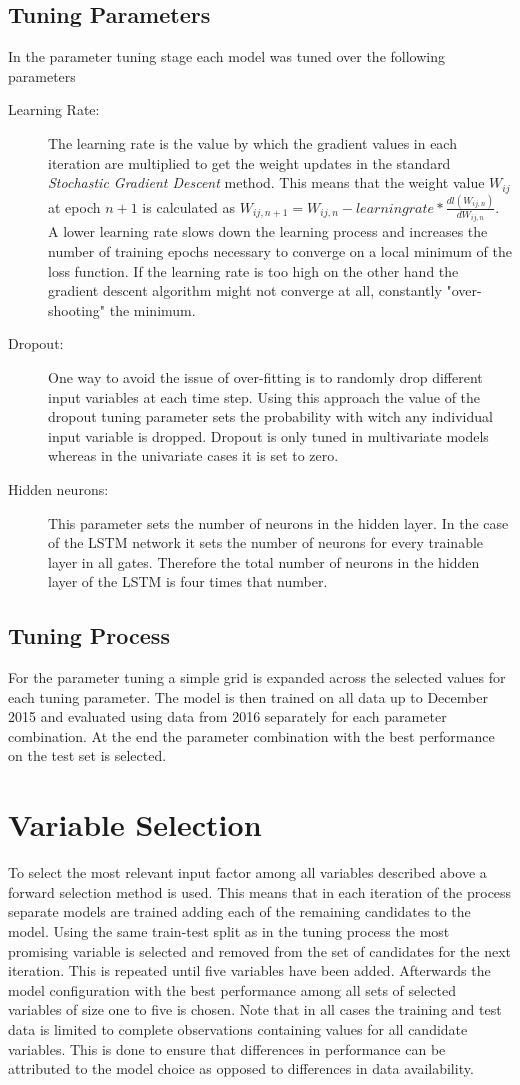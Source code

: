 \subsection{Tuning Parameters}
In the parameter tuning stage each model was tuned over the following parameters
\begin{description}
\item[Learning Rate:] The learning rate is the value by which the gradient values in each iteration are multiplied to get the weight updates in the standard \textit{Stochastic Gradient Descent} method. This means that the weight value $W_{ij}$ at epoch $n+1$ is calculated as $W_{ij, n+1} = W_{ij, n} - learningrate * \frac{dl(W_{ij, n})}{dW_{ij, n}}$. A lower learning rate slows down the learning process and increases the number of training epochs necessary to converge on a local minimum of the loss function. If the learning rate is too high on the other hand the gradient descent algorithm might not converge at all, constantly "over-shooting" the minimum.
\item[Dropout:] One way to avoid the issue of over-fitting is to randomly drop different input variables at each time step. Using this approach the value of the dropout tuning parameter sets the probability with witch any individual input variable is dropped. Dropout is only tuned in multivariate models whereas in the univariate cases it is set to zero.
\item[Hidden neurons:] This parameter sets the number of neurons in the hidden layer. In the case of the LSTM network it sets the number of neurons for every trainable layer in all gates. Therefore the total number of neurons in the hidden layer of the LSTM is four times that number.
\end{description}
\subsection{Tuning Process}
For the parameter tuning a simple grid is expanded across the selected values for each tuning parameter. The model is then trained on all data up to December 2015 and evaluated using data from 2016 separately for each parameter combination. At the end the parameter combination with the best performance on the test set is selected.
\section{Variable Selection}
To select the most relevant input factor among all variables described above a forward selection method is used. This means that in each iteration of the process separate models are trained adding each of the remaining candidates to the model. Using the same train-test split as in the tuning process the most promising variable is  selected and removed from the set of candidates for the next iteration. This is repeated until five variables have been added. Afterwards the model configuration with the best performance among all sets of selected variables of size one to five is chosen. Note that in all cases the training and test data is limited to complete observations containing values for all candidate variables. This is done to ensure that differences in performance can be attributed to the model choice as opposed to differences in data availability.
